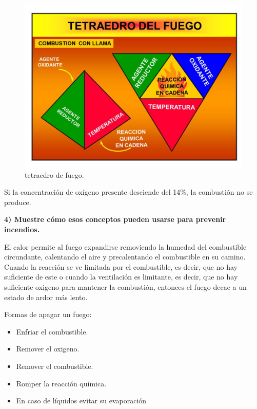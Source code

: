 \documentclass[letterpaper,11pt]{article}
\begin{document}
\begin{figure}[H]
\centering
\includegraphics[scale=0.4]{TETRAEDRO+DEL+FUEGO+AGENTE+REDUCTOR+OXIDANTE+TEMPERATURA.jpg} 
\caption{tetraedro de fuego.}
\label{fig:fig2}
\end{figure}


Si la concentración de oxígeno presente desciende del 14\%, la combustión no se produce.


\textbf{4) Muestre cómo esos conceptos pueden usarse para prevenir incendios.}

El calor permite al fuego expandirse removiendo la humedad del combustible circundante, calentando el aire y precalentando el combustible en su camino. Cuando la reacción se ve limitada por el combustible, es decir, que no hay suficiente de este o cuando la ventilación es limitante, es decir, que no hay suficiente oxigeno para mantener la combustión, entonces el fuego decae a un estado de ardor más lento.

Formas de apagar un fuego:

\begin{itemize}
	\item Enfriar el combustible.
	
	\item Remover el oxigeno.
	
	\item Remover el combustible.
	
	\item Romper la reacción química.
	
	\item En caso de líquidos evitar su evaporación
	
\end{itemize}
\end{document}
